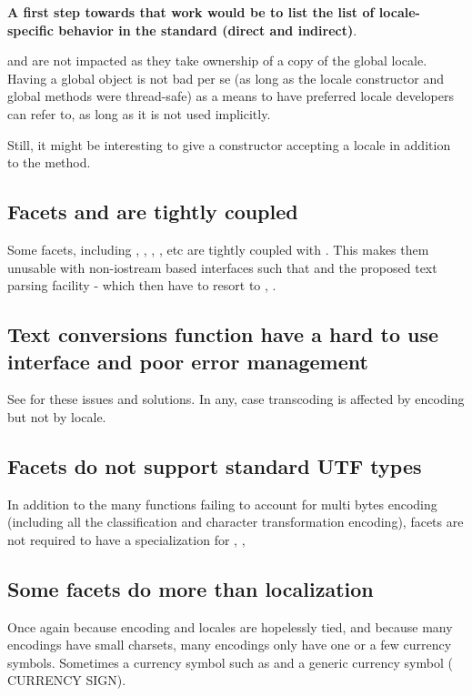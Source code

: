\documentclass{wg21}
\newcommand{\UnicodeLetter}[1]{\textbf{\textcolor{BrickRed}{\Large\tcode{#1}}}}
\begin{document}
\textbf{A first step towards that work would be to list the list of locale-specific behavior in the standard (direct and indirect)}.

 and  are not impacted as they take ownership of a copy of the global locale.
Having a global object is not bad per se (as long as the locale constructor and global methods were thread-safe) as a means to have preferred locale developers can refer to, as long as it is not used implicitly.

Still, it might be interesting to give  a constructor accepting a locale in addition to the  method.

\subsection{Facets and  are tightly coupled}

Some facets, including , , , , etc are tightly coupled with .
This makes them unusable with non-iostream based interfaces such that  and the proposed text parsing facility \cite{P1729R1} - which then have to resort to , .

\subsection{Text conversions function have a hard to use interface and poor error management}

See \cite{P1629R0} for these issues and solutions.
In any, case transcoding is affected by encoding but not by locale.
\subsection{Facets do not support standard UTF types}

In addition to the many functions failing to account for multi bytes encoding (including all the classification and character transformation encoding), facets are not required to have a specialization for , , 

\subsection{Some facets do more than localization}
Once again because encoding and locales are hopelessly tied, and because many encodings have small charsets, many encodings only have one or a few currency symbols. Sometimes a currency symbol such as \UnicodeLetter{\$} and a generic currency symbol (\UnicodeLetter{¤} CURRENCY SIGN).
\end{document}
